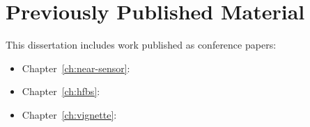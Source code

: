 \section{Previously Published Material}

This dissertation includes work published as conference papers:

\begin{itemize}
  \item Chapter~\ref{ch:near-sensor}: 
  \item Chapter~\ref{ch:hfbs}: 
  \item Chapter~\ref{ch:vignette}: 
\end{itemize}


